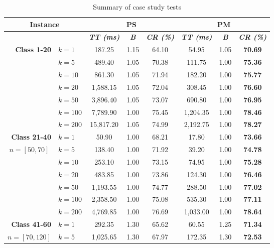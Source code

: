 \begin{table}[htbp]
    \centering
    \caption{Summary of case study tests}
    \begin{tabular}{|l|l|c|c|c|c|c|c|}
    \hline
    \multicolumn{ 2}{|c|}{\textbf{Instance}} & \multicolumn{ 3}{c|}{\textbf{PS}} & \multicolumn{ 3}{c|}{\textbf{PM}} \\ \hline
    \multicolumn{ 2}{|l|}{} & \textbf{\textit{TT (ms)}} & \textbf{\textit{B}} & \textbf{\textit{CR (\%)}} & \textbf{\textit{TT (ms)}} & \textbf{\textit{B}} & \textbf{\textit{CR (\%)}} \\ \hline
    \multicolumn{1}{|r|}{\textbf{Class 1-20}} & $k=1$ & 187.25 & 1.15 & 64.10 & 54.95 & 1.05 & \textbf{70.69} \\ 
     & $k=5$ & 489.40 & 1.05 & 70.38 & 111.75 & 1.00 & \textbf{75.36} \\ 
     & $k=10$ & 861.30 & 1.05 & 71.94 & 182.20 & 1.00 & \textbf{75.77} \\ 
     & $k=20$ & 1,588.15 & 1.05 & 72.04 & 308.45 & 1.00 & \textbf{76.60} \\ 
     & $k=50$ & 3,896.40 & 1.05 & 73.07 & 690.80 & 1.00 & \textbf{76.95} \\ 
     & $k=100$ & 7,789.90 & 1.00 & 75.45 & 1,204.35 & 1.00 & \textbf{78.46} \\ 
     & $k=200$ & 15,817.20 & 1.05 & 74.99 & 2,192.75 & 1.00 & \textbf{78.27} \\ \hline
    \multicolumn{1}{|r|}{\textbf{Class 21-40}} & $k=1$ & 50.90 & 1.00 & 68.21 & 17.80 & 1.00 & \textbf{73.66} \\ 
    \multicolumn{1}{|c|}{$n = [50, 70]$} & $k=5$ & 138.40 & 1.00 & 71.92 & 39.20 & 1.00 & \textbf{74.78} \\ 
     & $k=10$ & 253.10 & 1.00 & 73.15 & 74.95 & 1.00 & \textbf{75.28} \\ 
     & $k=20$ & 483.85 & 1.00 & 73.86 & 124.30 & 1.00 & \textbf{76.46} \\ 
     & $k=50$ & 1,193.55 & 1.00 & 74.77 & 288.50 & 1.00 & \textbf{77.02} \\ 
     & $k=100$ & 2,358.50 & 1.00 & 75.08 & 535.30 & 1.00 & \textbf{77.11} \\ 
     & $k=200$ & 4,769.85 & 1.00 & 76.69 & 1,033.00 & 1.00 & \textbf{78.64} \\ \hline
    \multicolumn{1}{|r|}{\textbf{Class 41-60}} & $k=1$ & 292.35 & 1.30 & 65.62 & 60.55 & 1.25 & \textbf{71.34} \\ 
    \multicolumn{1}{|c|}{$n = [70, 120]$} & $k=5$ & 1,025.65 & 1.30 & 67.97 & 172.35 & 1.30 & \textbf{72.53} \\ 

\end{tabular}
\end{table}
